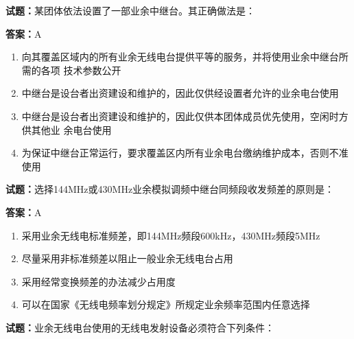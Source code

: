 \documentclass{ctexbook}
\begin{document}
\vspace{1em}

\textbf{试题：}某团体依法设置了一部业余中继台。其正确做法是： 

\textbf{答案：}A 

\begin{enumerate}[leftmargin=3em]
  \item 向其覆盖区域内的所有业余无线电台提供平等的服务，并将使用业余中继台所需的各项
技术参数公开 

  \item 中继台是设台者出资建设和维护的，因此仅供经设置者允许的业余电台使用 

  \item 中继台是设台者出资建设和维护的，因此仅供本团体成员优先使用，空闲时方供其他业
余电台使用 

  \item 为保证中继台正常运行，要求覆盖区内所有业余电台缴纳维护成本，否则不准使用 

\end{enumerate}





\vspace{1em}

\textbf{试题：}选择144MHz或430MHz业余模拟调频中继台同频段收发频差的原则是： 

\textbf{答案：}A 

\begin{enumerate}[leftmargin=3em]
  \item 采用业余无线电标准频差，即144MHz频段600kHz，430MHz频段5MHz 

  \item 尽量采用非标准频差以阻止一般业余无线电台占用 

  \item 采用经常变换频差的办法减少占用度 


  \item 可以在国家《无线电频率划分规定》所规定业余频率范围内任意选择 

\end{enumerate}





\vspace{1em}

\textbf{试题：}业余无线电台使用的无线电发射设备必须符合下列条件： 
\end{document}
